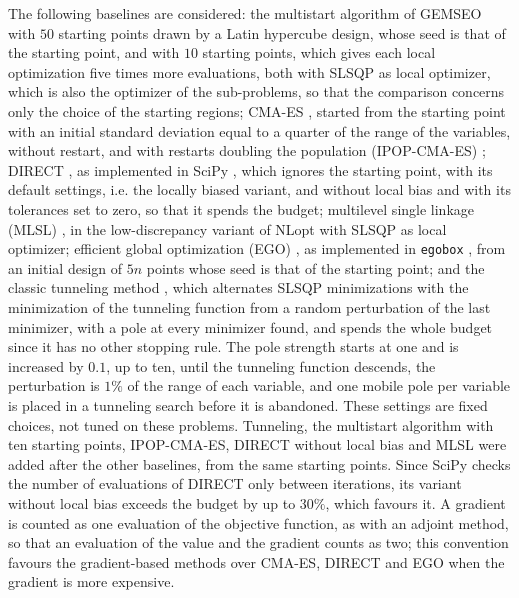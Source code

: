\documentclass[pdflatex,sn-basic]{sn-jnl}
\newcommand{\code}[1]{\texttt{\hyphenchar\font=45\relax #1}}
\begin{document}
The following baselines are considered: the multistart algorithm of GEMSEO with
$50$ starting points drawn by a Latin hypercube design, whose seed is that of
the starting point, and with $10$ starting points, which gives each local
optimization five times more evaluations, both with SLSQP as local optimizer, which is also the optimizer of
the sub-problems, so that the comparison concerns only the choice of the starting
regions; CMA-ES \citep{hansen2001,hansen2016}, started from the starting point
with an initial standard deviation equal to a quarter of the range of the
variables, without restart, and with restarts doubling the population
(IPOP-CMA-ES) \citep{auger2005}; DIRECT \citep{jones1993}, as implemented in
SciPy \citep{virtanen2020}, which ignores the starting point, with its default
settings, i.e. the locally biased variant, and without local bias and with its
tolerances set to zero, so that it spends the budget; multilevel single linkage
(MLSL) \citep{rinnooykan1987}, in the low-discrepancy variant of NLopt with
SLSQP as local optimizer; efficient global optimization (EGO)
\citep{jones1998}, as implemented in \code{egobox} \citep{lafage2022}, from an
initial design of $5n$ points whose seed is that of the starting point; and the
classic tunneling method \citep{levy1985}, which alternates SLSQP minimizations
with the minimization of the tunneling function from a random perturbation of
the last minimizer, with a pole at every minimizer found, and spends the whole
budget since it has no other stopping rule. The pole strength starts at one and
is increased by $0.1$, up to ten, until the tunneling function descends, the
perturbation is $1\%$ of the range of each variable, and one mobile pole per
variable is placed in a tunneling search before it is abandoned. These settings
are fixed choices, not tuned on these problems. Tunneling, the multistart
algorithm with ten starting points, IPOP-CMA-ES, DIRECT without local bias and
MLSL were added after the other baselines, from the same starting points. Since
SciPy checks the number of evaluations of DIRECT only between iterations, its
variant without local bias exceeds the budget by up to $30\%$, which favours
it. A
gradient is counted as one evaluation of the objective function, as with an
adjoint method, so that an evaluation of the value and the gradient counts as
two; this convention favours the gradient-based methods over CMA-ES, DIRECT and
EGO when the gradient is more expensive.
\end{document}
